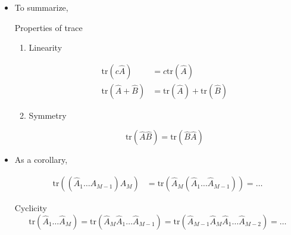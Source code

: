 \documentclass[9pt,handout]{beamer}
\newcommand{\tr}[0]{\text{tr}}
\begin{document}
\begin{frame}{}
\begin{itemize}
\item To summarize,

\begin{block}{Properties of trace}
\begin{enumerate}
\item Linearity

\begin{align*}
\tr \left( c \widehat{A} \right) & = c \tr \left( \widehat{A} \right) \\
\tr \left( \widehat{A} + \widehat{B} \right) & = \tr \left( \widehat{A} \right) + \tr \left( \widehat{B} \right)
\end{align*}

\item Symmetry

$$\tr \left( \widehat{A} \widehat{B} \right) = \tr \left( \widehat{B} \widehat{A} \right)$$
\end{enumerate}
\end{block}

\item As a corollary,

\begin{align*}
\tr \left( \left( \widehat{A}_1 \dots A_{M-1} \right) \widehat{A}_M \right) & = \tr \left( \widehat{A}_M \left( \widehat{A}_1 \dots \widehat{A}_{M-1} \right) \right) = \dots
\end{align*}

\begin{block}{Cyclicity}
$$\tr \left( \widehat{A}_1 \dots \widehat{A}_M \right) = \tr \left( \widehat{A}_M \widehat{A}_1 \dots \widehat{A}_{M-1} \right) = \tr \left( \widehat{A}_{M-1} \widehat{A}_M \widehat{A}_1 \dots \widehat{A}_{M-2} \right) = \dots$$
\end{block}
\end{itemize}
\end{frame}
\end{document}

